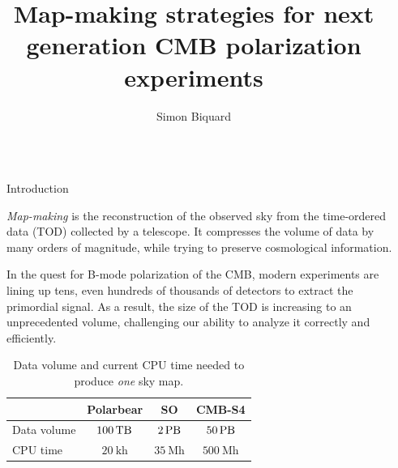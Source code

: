 \documentclass[final]{beamer}
\title{Map-making strategies for next generation CMB polarization experiments}
\author{Simon Biquard \inst{1}}
\institute[shortinst]{\inst{1} AstroParticule et Cosmologie, Paris, France}
\newlength{\sepwidth}
\newlength{\colwidth}
\newcommand{\separatorcolumn}{\begin{column}{\sepwidth}\end{column}}
\begin{document}

\begin{frame}[t]
  \begin{columns}[t]
    \separatorcolumn

    \begin{column}{\colwidth}

      \begin{block}{Introduction}

        \emph{Map-making} is the reconstruction of the observed sky from the time-ordered data (TOD) collected by a telescope.
        It compresses the volume of data by many orders of magnitude, while trying to preserve cosmological information.

        In the quest for B-mode polarization of the CMB, modern experiments are lining up tens, even hundreds of thousands of detectors to extract the primordial signal.
        As a result, the size of the TOD is increasing to an unprecedented volume, challenging our ability to analyze it correctly and efficiently.

        \begin{table}
          \centering
          \begin{tabular}{l c c c}
            \toprule
            \text{}     & \textbf{Polarbear}                 & \textbf{SO}                       & \textbf{CMB-S4}                    \\
            \midrule
            Data volume & $\qty[mode=text]{100}{\tera\byte}$ & $\qty[mode=text]{2}{\peta\byte}$  & $\qty[mode=text]{50}{\peta\byte}$  \\
            CPU time    & $\qty[mode=text]{20}{\kilo\hour}$  & $\qty[mode=text]{35}{\mega\hour}$ & $\qty[mode=text]{500}{\mega\hour}$ \\
            \bottomrule
          \end{tabular}
          \caption{Data volume and current CPU time needed to produce \emph{one} sky map.}
        \end{table}


\end{block}
\end{column}
\end{columns}
\end{frame}
\end{document}
